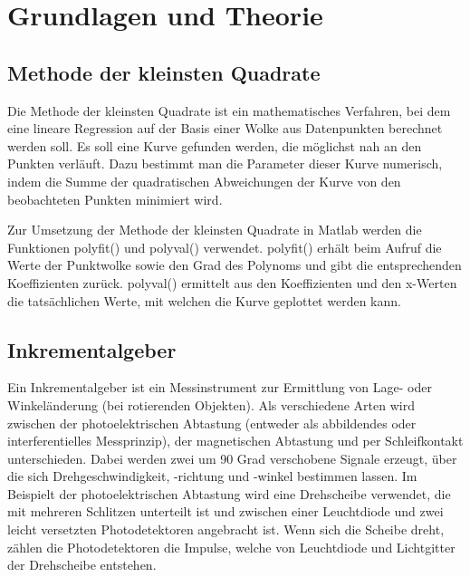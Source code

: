 \section{Grundlagen und Theorie}

\subsection{Methode der kleinsten Quadrate}
Die Methode der kleinsten Quadrate ist ein mathematisches Verfahren, bei dem eine lineare Regression
auf der Basis einer Wolke aus Datenpunkten berechnet werden soll. Es soll eine Kurve gefunden werden,
die möglichst nah an den Punkten verläuft. Dazu bestimmt man die Parameter dieser Kurve numerisch, indem die Summe 
der quadratischen Abweichungen der Kurve von den beobachteten Punkten minimiert wird.

Zur Umsetzung der Methode der kleinsten Quadrate in Matlab werden die Funktionen polyfit() und polyval() verwendet. 
polyfit() erhält beim Aufruf die Werte der Punktwolke sowie den Grad des Polynoms und gibt die entsprechenden Koeffizienten
zurück. polyval() ermittelt aus den Koeffizienten und den x-Werten die tatsächlichen Werte, mit welchen die Kurve geplottet 
werden kann. 

\subsection{Inkrementalgeber}
Ein Inkrementalgeber ist ein Messinstrument zur Ermittlung von Lage- oder Winkeländerung (bei rotierenden Objekten). 
Als verschiedene Arten wird zwischen der photoelektrischen Abtastung (entweder als abbildendes oder interferentielles
Messprinzip), der magnetischen Abtastung und per Schleifkontakt unterschieden. Dabei werden zwei um 90 Grad verschobene
Signale erzeugt, über die sich Drehgeschwindigkeit, -richtung und -winkel bestimmen lassen.
Im Beispielt der photoelektrischen Abtastung wird eine Drehscheibe verwendet, die mit mehreren Schlitzen unterteilt ist und 
zwischen einer Leuchtdiode und zwei leicht versetzten Photodetektoren angebracht ist. Wenn sich die Scheibe dreht, zählen
die Photodetektoren die Impulse, welche von Leuchtdiode und Lichtgitter der Drehscheibe entstehen.  